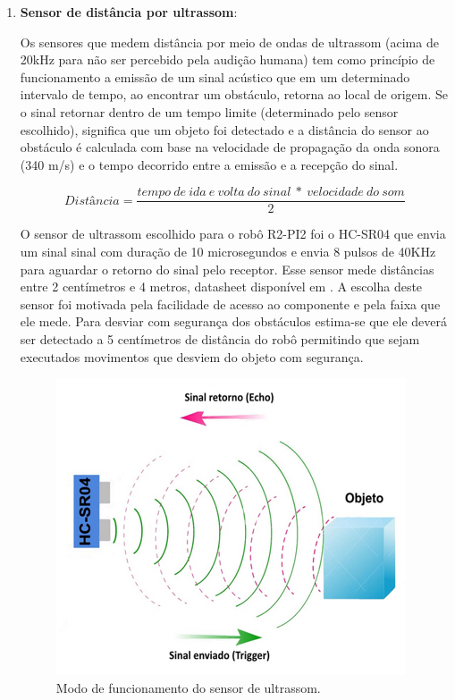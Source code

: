   \begin{enumerate}
  	\item \textbf{Sensor de distância por ultrassom}:

  		Os sensores que medem distância por meio de ondas de ultrassom (acima de 20kHz para não ser percebido pela audição humana) tem como princípio de funcionamento a emissão de um sinal acústico que em um determinado intervalo de tempo, ao encontrar um obstáculo, retorna ao local de origem. Se o sinal retornar dentro de um tempo limite (determinado pelo sensor escolhido), significa que um objeto foi detectado e a distância do sensor ao obstáculo é calculada com base na velocidade de propagação da onda sonora (340 m/s) e o tempo decorrido entre a emissão e a recepção do sinal.
  		
  		\begin{equation}
  		\label{eq:equação_ultrassom}
  			Distância = \frac{tempo\ de\ ida\ e\ volta\ do\ sinal\ *\ velocidade\ do\ som}{2}
  		\end{equation}

  		O sensor de ultrassom escolhido para o robô R2-PI2 foi o HC-SR04 que envia um sinal sinal com duração de 10 microsegundos e envia 8 pulsos de 40KHz para aguardar o retorno do sinal pelo receptor. Esse sensor mede distâncias entre 2 centímetros e 4 metros, datasheet disponível em \cite{datasheet_ultrassom}. A escolha deste sensor foi motivada pela facilidade de acesso ao componente e pela faixa que ele mede. Para desviar com segurança dos obstáculos estima-se que ele deverá ser detectado a 5 centímetros de distância do robô permitindo que sejam executados movimentos que desviem do objeto com segurança.

  		\begin{figure}[H]                                                           
      		\centering                                                                
      		\includegraphics[scale=0.7]{figuras/Ultrassom_principio.png}               
      		\caption{Modo de funcionamento do sensor de ultrassom.}    
      		\label{img:funcionamento_utrassom}                                            
    	\end{figure} 


\end{enumerate}
